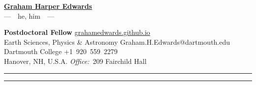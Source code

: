\documentclass[10pt]{article}
\begin{document}
\begin{center}
\LARGE\textbf{\underline{Graham Harper Edwards}}\\ [.3em]
\large ---~~he, him~~---
\end{center}

\textbf{Postdoctoral Fellow} \hfill \href{https://grahamedwards.github.io}{grahamedwards.github.io} \\
Earth Sciences, Physics \& Astronomy \hfill Graham.H.Edwards{\small @dartmouth.edu} \\
Dartmouth College \hfill +1~920~559~2279  \\
Hanover, NH, U.S.A.	\hfill \textit{Office:}~209 Fairchild Hall

\vspace{1em}





















\begin{center}{\rule{2.5in}{0.5pt}}\end{center}  \begin{center}\vspace{-16pt} {\rule{2.5in}{0.5pt}}\end{center}



\end{document}
